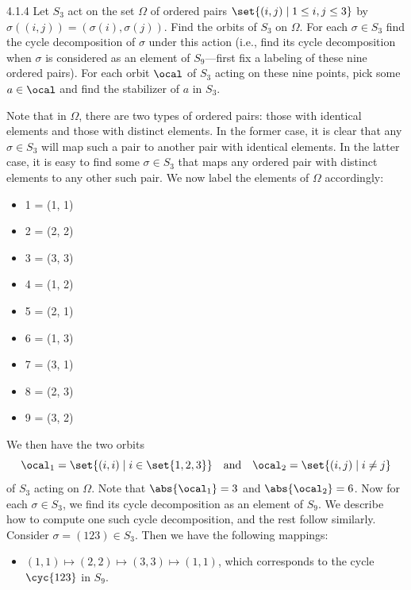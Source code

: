 \begin{exercise}{4.1.4}
	Let \(S_3\) act on the set \(\Omega\) of ordered pairs \(\set{(i,j) \mid 1 \leq i,j \leq 3}\) by \(\sigma((i,j)) = (\sigma(i), \sigma(j))\).
	Find the orbits of \(S_3\) on \(\Omega\).
	For each \(\sigma \in S_3\) find the cycle decomposition of \(\sigma\) under this action (i.e., find its cycle decomposition when \(\sigma\) is considered as an element of \(S_9\)—first fix a labeling of these nine ordered pairs).
	For each orbit \(\ocal\) of $S_3$ acting on these nine points, pick some \(a \in \ocal\) and find the stabilizer of \(a\) in \(S_3\).
\end{exercise}

\begin{sol}
	Note that in $\Omega$, there are two types of ordered pairs: those with identical elements and those with distinct elements.
	In the former case, it is clear that any $\sigma \in S_3$ will map such a pair to another pair with identical elements.
	In the latter case, it is easy to find some $\sigma \in S_3$ that maps any ordered pair with distinct elements to any other such pair.
	We now label the elements of $\Omega$ accordingly:
    \begin{itemize}
        \item 1 = (1, 1)
        \item 2 = (2, 2)
        \item 3 = (3, 3)
        \item 4 = (1, 2)
        \item 5 = (2, 1)
        \item 6 = (1, 3)
        \item 7 = (3, 1)
        \item 8 = (2, 3)
        \item 9 = (3, 2)
    \end{itemize}
	We then have the two orbits 
	\[
		\ocal_1 = \set{(i, i) \mid i \in \set{1, 2, 3}} \quad \text{and} \quad \ocal_2 = \set{(i, j) \mid i \neq j}
	\]
	of $S_3$ acting on $\Omega$.
	Note that $\abs{\ocal_1} = 3$ and $\abs{\ocal_2} = 6$.
	Now for each $\sigma \in S_3$, we find its cycle decomposition as an element of $S_9$.
	We describe how to compute one such cycle decomposition, and the rest follow similarly.
	Consider $\sigma = (1 2 3) \in S_3$.
	Then we have the following mappings:
	\begin{itemize}
		\item $(1, 1) \mapsto (2, 2) \mapsto (3, 3) \mapsto (1, 1)$, which corresponds to the cycle $\cyc{1 2 3}$ in $S_9$.

\end{itemize}
\end{sol}
